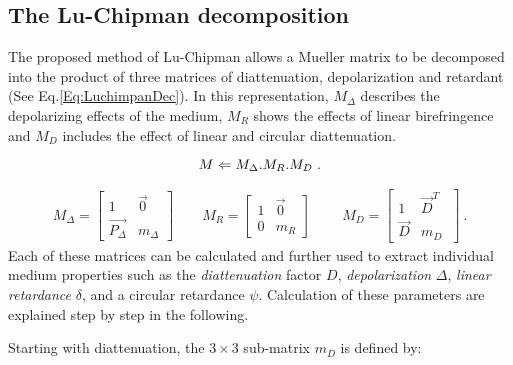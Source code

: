 \subsection{The Lu-Chipman decomposition}
The proposed method of Lu-Chipman \cite{lu1996interpretation} allows a Mueller matrix to be decomposed into the product of three matrices of diattenuation, depolarization and retardant (See Eq.\ref{Eq:LuchimpanDec}).
In this representation, $M_{\Delta}$ describes the depolarizing effects of the medium, $M_{R}$ shows the effects of linear birefringence and $M_{D}$ includes the effect of linear and circular diattenuation. 

 	\begin{equation}\label{Eq:LuchimpanDec}
	\small
	M\Leftarrow M_{\Delta}.M_{R}.M_{D}~.\\
	\end{equation}
	
	
	\begin{align}
	M_{\Delta} = 
	\begin{bmatrix}
	1 &  \overrightarrow{0}\\ \overrightarrow{P_{\Delta}}  & m_{\Delta}
	\end{bmatrix} \qquad
	M_{R} = 
	\begin{bmatrix}
	1 & \overrightarrow{0}\\ 0 & m_{R}
	\end{bmatrix} \qquad \
	M_{D} = 
	\begin{bmatrix}
	1 & \overrightarrow{D}^{T}\\ \overrightarrow{D} &  m_{D} \
	\end{bmatrix}~.
	\end{align}
\noindent Each of these matrices can be calculated and further used to extract individual medium properties such as the \textit{diattenuation} factor $D$, \textit{depolarization} $\Delta$, \textit{linear retardance} $\delta$, and a circular retardance $\psi$. Calculation of these parameters are explained step by step in the following. 

Starting with diattenuation, the $3 \times 3$ sub-matrix $m_{D}$ is defined by: 

